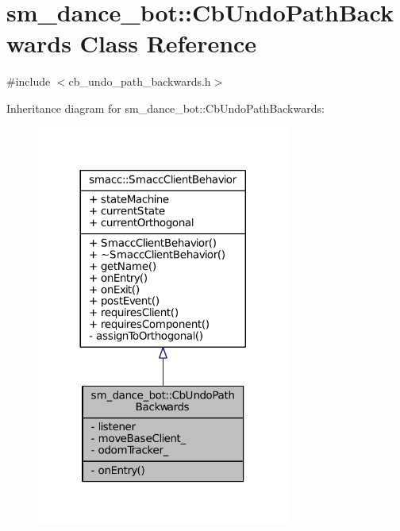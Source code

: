 \hypertarget{classsm__dance__bot_1_1CbUndoPathBackwards}{}\section{sm\+\_\+dance\+\_\+bot\+:\+:Cb\+Undo\+Path\+Backwards Class Reference}
\label{classsm__dance__bot_1_1CbUndoPathBackwards}


{\ttfamily \#include $<$cb\+\_\+undo\+\_\+path\+\_\+backwards.\+h$>$}



Inheritance diagram for sm\+\_\+dance\+\_\+bot\+:\+:Cb\+Undo\+Path\+Backwards\+:
\nopagebreak
\begin{figure}[H]
\begin{center}
\leavevmode
\includegraphics[width=236pt]{classsm__dance__bot_1_1CbUndoPathBackwards__inherit__graph}
\end{center}
\end{figure}


